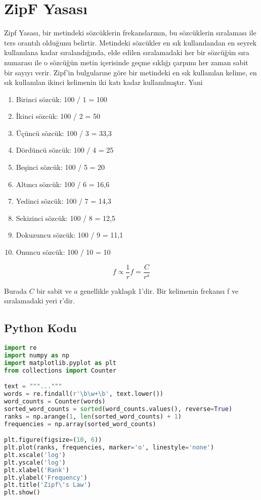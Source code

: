 \section{ZipF Yasası}
Zipf Yasası, bir metindeki sözcüklerin frekanslarının, bu sözcüklerin sıralaması ile ters orantılı olduğunu belirtir. Metindeki sözcükler en sık kullanılandan en seyrek kullanılana kadar sıralandığında, elde edilen sıralamadaki her bir sözcüğün sıra numarası ile o sözcüğün metin içerisinde geçme sıklığı çarpımı her zaman sabit bir sayıyı verir. Zipf'in bulgularıne göre bir metindeki en sık kullanılan kelime, en sık kullanılan ikinci kelimenin iki katı kadar kullanılmıştır.  Yani

\begin{enumerate}
	\item Birinci sözcük: 100 / 1 = 100
	\item İkinci sözcük: 100 / 2 = 50
	\item Üçüncü sözcük: 100 / 3 = 33,3
	\item Dördüncü sözcük: 100 / 4 = 25
	\item Beşinci sözcük: 100 / 5 = 20
	\item Altıncı sözcük: 100 / 6 = 16,6
	\item Yedinci sözcük: 100 / 7 = 14,3
	\item Sekizinci sözcük: 100 / 8 = 12,5
	\item Dokuzuncu sözcük: 100 / 9 = 11,1
	\item Onuncu sözcük: 100 / 10 = 10
\end{enumerate}

\[
f \propto \frac{1}{r}
f = \frac{C}{r^a}
\]

Burada \( C \) bir sabit ve \( a \) genellikle yaklaşık 1'dir. Bir kelimenin frekansı f ve sıralamadaki yeri r'dir.

\subsection{Python Kodu}

\begin{lstlisting}[language=Python]
import re
import numpy as np
import matplotlib.pyplot as plt
from collections import Counter

text = """..."""
words = re.findall(r'\b\w+\b', text.lower())
word_counts = Counter(words)
sorted_word_counts = sorted(word_counts.values(), reverse=True)
ranks = np.arange(1, len(sorted_word_counts) + 1)
frequencies = np.array(sorted_word_counts)

plt.figure(figsize=(10, 6))
plt.plot(ranks, frequencies, marker='o', linestyle='none')
plt.xscale('log')
plt.yscale('log')
plt.xlabel('Rank')
plt.ylabel('Frequency')
plt.title('Zipf\'s Law')
plt.show()
\end{lstlisting}


\newpage